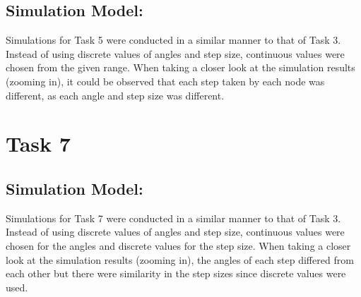 \documentclass[8pt]{extarticle}
\begin{document}
\subsection*{Simulation Model:}
Simulations for Task 5 were conducted in a similar manner to that of Task 3. Instead of using discrete values of angles and step size, continuous values were chosen from the given range. When taking a closer look at the simulation results (zooming in), it could be observed that each step taken by each node was different, as each angle and step size was different.


\section*{Task 7}
\subsection*{Simulation Model:}
Simulations for Task 7 were conducted in a similar manner to that of Task 3. Instead of using discrete values of angles and step size, continuous values were chosen for the angles and discrete values for the step size. When taking a closer look at the simulation results (zooming in), the angles of each step differed from each other but there were similarity in the step sizes since discrete values were used.
\end{document}
